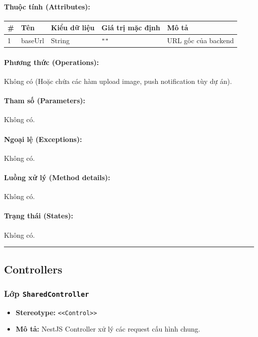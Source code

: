 \documentclass[12pt,a4paper]{article}
\begin{document}
\paragraph{Thuộc tính (Attributes):}
\begin{longtable}{|p{0.6cm}|p{2.8cm}|p{2.2cm}|p{1.8cm}|p{5.8cm}|}
\hline
\textbf{\#} & \textbf{Tên} & \textbf{Kiểu dữ liệu} & \textbf{Giá trị mặc định} & \textbf{Mô tả} \\ \hline
\endhead
1 & baseUrl & String & \texttt{""} & URL gốc của backend \\ \hline
\end{longtable}

\paragraph{Phương thức (Operations):}
Không có (Hoặc chứa các hàm upload image, push notification tùy dự án).

\paragraph{Tham số (Parameters):}
Không có.

\paragraph{Ngoại lệ (Exceptions):}
Không có.

\paragraph{Luồng xử lý (Method details):}
Không có.

\paragraph{Trạng thái (States):}
Không có.

\vskip 0.5cm
\noindent\rule{\textwidth}{0.5pt}
\vskip 0.5cm

\subsection{Controllers}

\subsubsection{Lớp \texttt{SharedController}}
\begin{itemize}[leftmargin=*]
    \item \textbf{Stereotype:} \texttt{\textless{}\textless{}Control\textgreater{}\textgreater{}}
    \item \textbf{Mô tả:} NestJS Controller xử lý các request cấu hình chung.
\end{itemize}
\end{document}
